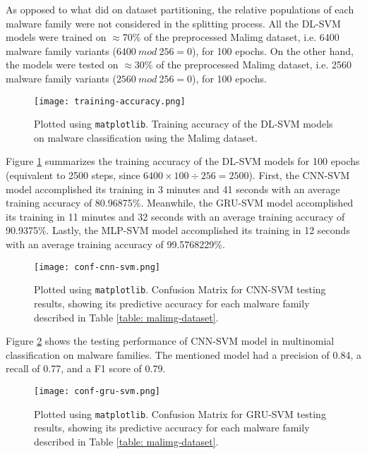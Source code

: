\documentclass[sigconf]{acmart}
\begin{document}
\indent	As opposed to what \cite{garcia2016random} did on dataset partitioning, the relative populations of each malware family were not considered in the splitting process. All the DL-SVM models were trained on $\approx$70\% of the preprocessed Malimg dataset\cite{nataraj2011malware}, i.e. 6400 malware family variants ($6400\ mod\ 256 = 0$), for 100 epochs. On the other hand, the models were tested on $\approx$30\% of the preprocessed Malimg dataset\cite{nataraj2011malware}, i.e. 2560 malware family variants ($2560\ mod\ 256 = 0$), for 100 epochs.
\begin{figure}[!htb]
	\centering
		\texttt{[image: training-accuracy.png]}
		\caption{Plotted using \texttt{matplotlib}\cite{Hunter:2007}. Training accuracy of the DL-SVM models on malware classification using the Malimg dataset\cite{nataraj2011malware}.}
		\label{training-accuracy}
	\endminipage\hfill
\end{figure}

\indent	Figure \ref{training-accuracy} summarizes the training accuracy of the DL-SVM models for 100 epochs (equivalent to 2500 steps, since $6400 \times 100 \div 256 = 2500$). First, the CNN-SVM model accomplished its training in 3 minutes and 41 seconds with an average training accuracy of 80.96875\%. Meanwhile, the GRU-SVM model accomplished its training in 11 minutes and 32 seconds with an average training accuracy of 90.9375\%. Lastly, the MLP-SVM model accomplished its training in 12 seconds with an average training accuracy of 99.5768229\%.

\begin{figure}[htb!]
	\centering
		\texttt{[image: conf-cnn-svm.png]}
		\caption{Plotted using \texttt{matplotlib}\cite{Hunter:2007}. Confusion Matrix for CNN-SVM testing results, showing its predictive accuracy for each malware family described in Table \ref{table: malimg-dataset}.}
		\label{conf-cnn-svm}
	\endminipage\hfill
\end{figure}

Figure \ref{conf-cnn-svm} shows the testing performance of CNN-SVM model in multinomial classification on malware families. The mentioned model had a precision of 0.84, a recall of 0.77, and a F1 score of 0.79.

\begin{figure}[!htb]
	\centering
		\texttt{[image: conf-gru-svm.png]}
		\caption{Plotted using \texttt{matplotlib}\cite{Hunter:2007}. Confusion Matrix for GRU-SVM testing results, showing its predictive accuracy for each malware family described in Table \ref{table: malimg-dataset}.}
		\label{conf-gru-svm}
	\endminipage\hfill
\end{figure}
\end{document}
